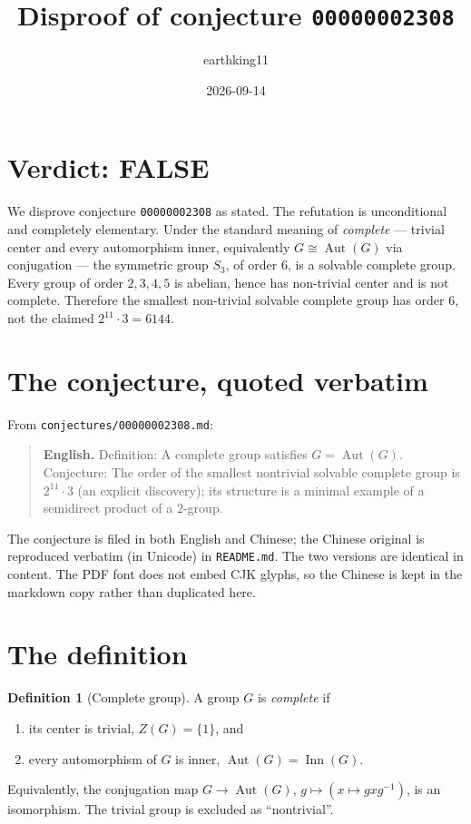 \documentclass[11pt]{article}
\title{Disproof of conjecture \texttt{00000002308}}
\author{earthking11}
\date{2026-09-14}
\theoremstyle{definition}
\newtheorem{definition}[theorem]{Definition}
\theoremstyle{remark}
\newcommand{\Aut}{\operatorname{Aut}}
\newcommand{\Inn}{\operatorname{Inn}}
\newcommand{\Sthree}{S_3}
\begin{document}
\maketitle

\section*{Verdict: FALSE}

We disprove conjecture \texttt{00000002308} as stated. The refutation is
unconditional and completely elementary. Under the standard meaning of
\emph{complete} --- trivial center and every automorphism inner, equivalently
$G \cong \Aut(G)$ via conjugation --- the symmetric group $\Sthree$, of order
$6$, is a solvable complete group. Every group of order $2,3,4,5$ is abelian,
hence has non-trivial center and is not complete. Therefore the smallest
non-trivial solvable complete group has order $6$, not the claimed
$2^{11}\cdot 3 = 6144$.

\section{The conjecture, quoted verbatim}

From \texttt{conjectures/00000002308.md}:

\begin{quote}
\textbf{English.} Definition: A complete group satisfies $G = \Aut(G)$.
Conjecture: The order of the smallest nontrivial solvable complete group is
$2^{11}\cdot 3$ (an explicit discovery); its structure is a minimal example of a
semidirect product of a $2$-group.
\end{quote}

The conjecture is filed in both English and Chinese; the Chinese original is
reproduced verbatim (in Unicode) in \texttt{README.md}. The two versions are
identical in content. The PDF font does not embed CJK glyphs, so the Chinese is
kept in the markdown copy rather than duplicated here.

\section{The definition}

\begin{definition}[Complete group]\label{def:complete}
A group $G$ is \emph{complete} if
\begin{enumerate}
\item its center is trivial, $Z(G) = \{1\}$, and
\item every automorphism of $G$ is inner, $\Aut(G) = \Inn(G)$.
\end{enumerate}
Equivalently, the conjugation map $G \to \Aut(G)$, $g \mapsto (x \mapsto gxg^{-1})$,
is an isomorphism. The trivial group is excluded as ``nontrivial''.
\end{definition}
\end{document}
